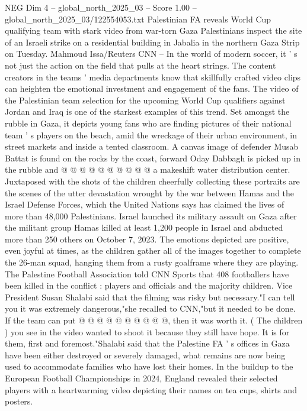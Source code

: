 \begin{textsample}{NEG Dim 4 – global\_north\_2025\_03 – Score 1.00 – global\_north\_2025\_03/122554053.txt}  \label{ex:f4_neg_395}
Palestinian FA reveals World Cup qualifying team with stark video from war-torn Gaza Palestinians inspect the site of an Israeli strike on a residential building in Jabalia in the northern Gaza Strip on Tuesday.
Mahmoud Issa/Reuters CNN -- In the world of modern soccer, it ' s not just the action on the field that pulls at the heart strings.
The content creators in the teams ' media departments know that skillfully crafted video clips can heighten the emotional investment and engagement of the fans.
The video of the Palestinian team selection for the upcoming World Cup qualifiers against Jordan and Iraq is one of the starkest examples of this trend.
Set amongst the rubble in Gaza, it depicts young fans who are finding pictures of their national team ' s players on the beach, amid the wreckage of their urban environment, in street markets and inside a tented classroom.
A canvas image of defender Musab Battat is found on the rocks by the coast, forward Oday Dabbagh is picked up in the rubble and @ @ @ @ @ @ @ @ @ @ a makeshift water distribution center.
Juxtaposed with the shots of the children cheerfully collecting these portraits are the scenes of the utter devastation wrought by the war between Hamas and the Israel Defense Forces, which the United Nations says has claimed the lives of more than 48,000 Palestinians.
Israel launched its military assault on Gaza after the militant group Hamas killed at least 1,200 people in Israel and abducted more than 250 others on October 7, 2023.
The emotions depicted are positive, even joyful at times, as the children gather all of the images together to complete the 26-man squad, hanging them from a rusty goalframe where they are playing.
The Palestine Football Association told CNN Sports that 408 footballers have been killed in the conflict : players and officials and the majority children.
Vice President Susan Shalabi said that the filming was risky but necessary."I can tell you it was extremely dangerous,"she recalled to CNN,"but it needed to be done.
If the team can put @ @ @ @ @ @ @ @ @ @, then it was worth it. ( The children ) you see in the video wanted to shoot it because they still have hope.
It is for them, first and foremost."Shalabi said that the Palestine FA ' s offices in Gaza have been either destroyed or severely damaged, what remains are now being used to accommodate families who have lost their homes.
In the buildup to the European Football Championships in 2024, England revealed their selected players with a heartwarming video depicting their names on tea cups, shirts and posters.

\end{textsample}
